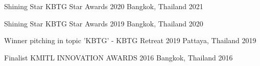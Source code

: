


\begin{cvhonors}


  \cvhonor
    {Shining Star} %
    {KBTG Star Awards 2020} %
    {Bangkok, Thailand} %
    {2021} %


  \cvhonor
    {Shining Star} %
    {KBTG Star Awards 2019} %
    {Bangkok, Thailand} %
    {2020} %


  \cvhonor
    {Winner} %
    {pitching in topic 'KBTG' - KBTG Retreat 2019} %
    {Pattaya, Thailand} %
    {2019} %


  \cvhonor
    {Finalist} %
    {KMITL INNOVATION AWARDS 2016} %
    {Bangkok, Thailand} %
    {2016} %

\end{cvhonors}
